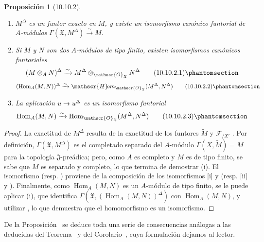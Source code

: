\documentclass[oneside]{amsart}
\theoremstyle{ega-env-style}
\theoremstyle{ega-thm-env-style}
\newtheorem*{proposition}{Proposición}
\theoremstyle{ega-defn-env-style}
\renewcommand{\to}{\mathchoice{\longrightarrow}{\rightarrow}{\rightarrow}{\rightarrow}}
\let\EGAOriginalLabel\label
\renewcommand{\label}[1]{\phantomsection\EGAOriginalLabel{#1}}
\begin{document}
\begin{proposition}[10.10.2]
\label{I.10.10.2}
\medskip\noindent
\begin{enumerate}
  \item[\rm{(i)}] $M^\Delta$ es un funtor exacto en $M$, y existe un isomorfismo canónico funtorial de $A$-módulos $\Gamma(\mathfrak{X},M^\Delta)\xrightarrow{\sim}M$.
  \item[\rm{(ii)}] Si $M$ y $N$ son dos $A$-módulos de tipo finito, existen isomorfismos canónicos funtoriales
    \[
      (M\otimes_A N)^\Delta
      \xrightarrow{\sim}
      M^\Delta\otimes_{\mathscr{O}_{\mathfrak{X}}}N^\Delta
      \tag{10.10.2.1}\label{I.10.10.2.1-fr}
    \]
    \[
      (\operatorname{Hom}_A(M,N))^\Delta
      \xrightarrow{\sim}
      \mathscr{H}\!om_{\mathscr{O}_{\mathfrak{X}}}
      (M^\Delta,N^\Delta)
      \tag{10.10.2.2}\label{I.10.10.2.2-fr}
    \]
  \item[\rm{(iii)}] La aplicación $u\to u^\Delta$ es un isomorfismo funtorial
    \[
      \operatorname{Hom}_A(M,N)
      \xrightarrow{\sim}
      \operatorname{Hom}_{\mathscr{O}_{\mathfrak{X}}}
      (M^\Delta,N^\Delta)
      \tag{10.10.2.3}\label{I.10.10.2.3-fr}
    \]
\end{enumerate}
\end{proposition}

\begin{proof}
La exactitud de $M^\Delta$ resulta de la exactitud de los funtores $\widetilde M$  y $\mathscr{F}_{/X'}$ .
Por definición, $\Gamma(\mathfrak{X},M^\Delta)$ es el completado separado del $A$-módulo $\Gamma(X,\widetilde M)=M$ para la topología $\mathfrak{J}$-preádica; pero, como $A$ es completo y $M$ es de tipo finito, se sabe  que $M$ es separado y completo, lo que termina de demostrar (i).
El isomorfismo  (resp. ) proviene de la composición de los isomorfismos [i] y  (resp. [ii] y ).
Finalmente, como $\operatorname{Hom}_A(M,N)$ es un $A$-módulo de tipo finito, se le puede aplicar (i), que identifica $\Gamma(\mathfrak{X},(\operatorname{Hom}_A(M,N))^\Delta)$ con $\operatorname{Hom}_A(M,N)$, y utilizar , lo que demuestra que el homomorfismo  es un isomorfismo.
\end{proof}

De la Proposición~ se deduce toda una serie de consecuencias análogas a las deducidas del Teorema~ y del Corolario~, cuya formulación dejamos al lector.
\end{document}

